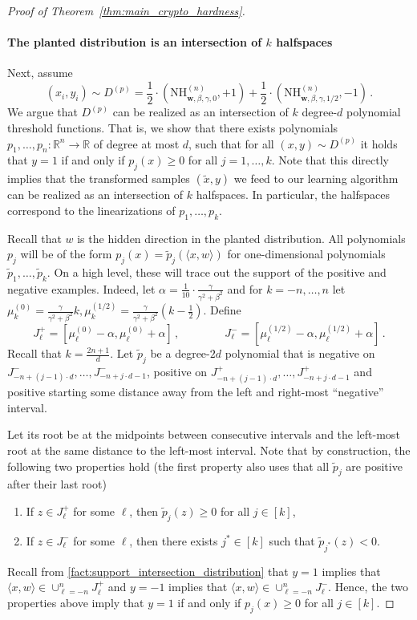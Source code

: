 \documentclass{theoretics}
\newcommand{\Paren}[1]{\left(#1\right)}
\newcommand{\iprod}[1]{\langle#1\rangle}
\newcommand{\R}{\mathbb R}
\renewcommand{\geq}{\geqslant}
\newcommand{\nhclwed}[4]{\mathrm{NH}_{#1,#2,#3,#4}}
\begin{document}
\begin{proof}[Proof of Theorem~\ref{thm:main_crypto_hardness}]
    \paragraph{The planted distribution is an intersection of $k$ halfspaces}
    Next, assume
    \[(x_i,y_i) \sim D^{(p)} = \frac 1 2 \cdot \Paren{\nhclwed{\bm w}{\beta}{\gamma}{0}^{(n)}, +1} + \frac 1 2 \cdot \Paren{\nhclwed{\bm w}{\beta}{\gamma}{1/2}^{(n)}, -1}\,.\]
    We argue that $D^{(p)}$ can be realized as an intersection of $k$ degree-$d$ polynomial threshold functions.
    That is, we show that there exists polynomials $p_1, \ldots, p_n \colon \R^n \rightarrow \R$ of degree at most $d$, such that for all $(x,y) \sim D^{(p)}$ it holds that $y = 1$ if and only if $p_j(x) \geq 0$ for all $j = 1,\ldots, k$.
    Note that this directly implies that the transformed samples $(\tilde{x},y)$ we feed to our learning algorithm can be realized as an intersection of $k$ halfspaces.
    In particular, the halfspaces correspond to the linearizations of $p_1, \ldots, p_k$.

    Recall that $w$ is the hidden direction in the planted distribution.
    All polynomials $p_j$ will be of the form $p_j(x) = \tilde{p}_j(\iprod{x,w})$ for one-dimensional polynomials $\tilde{p}_1,\ldots,\tilde{p}_k$.
    On a high level, these will trace out the support of the positive and negative examples.
    Indeed, let $\alpha = \tfrac 1 {10} \cdot \tfrac \gamma {\gamma^2 + \beta^2}$ and for $k = -n,\ldots, n$ let $\mu_k^{(0)} = \tfrac \gamma {\gamma^2 + \beta^2} k,\mu_k^{(1/2)} = \tfrac \gamma {\gamma^2 + \beta^2} (k-\tfrac 1 2)$.
    Define
    \[J^{+}_\ell = [\mu_\ell^{(0)}-\alpha,\mu_\ell^{(0)}+\alpha]\,,\quad\quad\quad\quad J^{-}_\ell = [\mu_\ell^{(1/2)}-\alpha,\mu_\ell^{(1/2)}+\alpha]\,.\]
    Recall that $k = \tfrac {2n+1} d$.
    Let $\tilde{p}_j$ be a degree-$2d$ polynomial that is negative on $J^-_{-n+(j-1)\cdot d}, \ldots, J^-_{-n+j\cdot d -1}$, positive on $J^+_{-n+(j-1)\cdot d}, \ldots, J^+_{-n+ j\cdot d-1}$ and positive starting some distance away from the left and right-most ``negative'' interval.

    Let its root be at the midpoints between consecutive intervals and the left-most root at the same distance to the left-most interval.
    Note that by construction, the following two properties hold (the first property also uses that all $\tilde{p}_j$ are positive after their last root)
    \begin{enumerate}
        \item If $z \in J_\ell^+$ for some $\ell$, then $\tilde{p}_j(z) \geq 0$ for all $j \in [k]$,
        \item If $z \in J_\ell^-$ for some $\ell$, then there exists $j^* \in [k]$ such that $\tilde{p}_{j^*}(z) < 0$.
    \end{enumerate}
    Recall from \cref{fact:support_intersection_distribution} that $y = 1$ implies that $\iprod{x,w} \in \cup_{\ell=-n}^n J_\ell^+$ and $y = -1$ implies that $\iprod{x,w} \in \cup_{\ell=-n}^n J_\ell^-$.
    Hence, the two properties above imply that $y = 1$ if and only if $p_j(x) \geq 0$ for all $j \in [k]$.


\end{proof}
\end{document}

